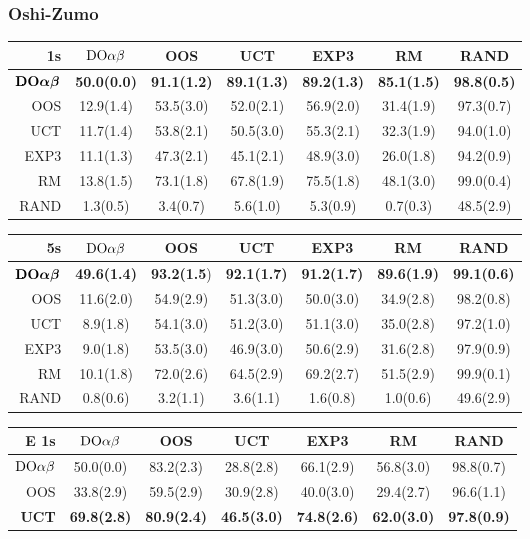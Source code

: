 \subsubsection{Oshi-Zumo}

\begin{table}[t!]
\centering
\begin{scriptsize}
\begin{tabular}{|r|cccccc|}\hline
1s&$\textrm{DO}\alpha\beta$&OOS&UCT&EXP3&RM&RAND\\\hline
$\textrm{\bf DO}\boldsymbol{\alpha\beta}$&\textbf{50.0(0.0)}&\textbf{91.1(1.2)}&\textbf{89.1(1.3)}&\textbf{89.2(1.3)}&\textbf{85.1(1.5)}&\textbf{98.8(0.5)}\\
OOS&12.9(1.4)&53.5(3.0)&52.0(2.1)&56.9(2.0)&31.4(1.9)&97.3(0.7)\\
UCT&11.7(1.4)&53.8(2.1)&50.5(3.0)&55.3(2.1)&32.3(1.9)&94.0(1.0)\\
EXP3&11.1(1.3)&47.3(2.1)&45.1(2.1)&48.9(3.0)&26.0(1.8)&94.2(0.9)\\
RM&13.8(1.5)&73.1(1.8)&67.8(1.9)&75.5(1.8)&48.1(3.0)&99.0(0.4)\\
RAND&1.3(0.5)&3.4(0.7)&5.6(1.0)&5.3(0.9)&0.7(0.3)&48.5(2.9)\\
\hline
\end{tabular}
\begin{tabular}{|r|cccccc|}\hline
5s&$\textrm{DO}\alpha\beta$&OOS&UCT&EXP3&RM&RAND\\\hline
$\textrm{\bf DO}\boldsymbol{\alpha\beta}$&\textbf{49.6(1.4)}&\textbf{93.2(1.5})&\textbf{92.1(1.7)}&\textbf{91.2(1.7)}&\textbf{89.6(1.9)}&\textbf{99.1(0.6)}\\
OOS&11.6(2.0)&54.9(2.9)&51.3(3.0)&50.0(3.0)&34.9(2.8)&98.2(0.8)\\
UCT&8.9(1.8)&54.1(3.0)&51.2(3.0)&51.1(3.0)&35.0(2.8)&97.2(1.0)\\
EXP3&9.0(1.8)&53.5(3.0)&46.9(3.0)&50.6(2.9)&31.6(2.8)&97.9(0.9)\\
RM&10.1(1.8)&72.0(2.6)&64.5(2.9)&69.2(2.7)&51.5(2.9)&99.9(0.1)\\
RAND&0.8(0.6)&3.2(1.1)&3.6(1.1)&1.6(0.8)&1.0(0.6)&49.6(2.9)\\
\hline
\end{tabular}
\begin{tabular}{|r|cccccc|}\hline
E 1s&$\textrm{DO}\alpha\beta$&OOS&UCT&EXP3&RM&RAND\\\hline
$\textrm{DO}\alpha\beta$&50.0(0.0)&83.2(2.3)&28.8(2.8)&66.1(2.9)&56.8(3.0)&98.8(0.7)\\
OOS&33.8(2.9)&59.5(2.9)&30.9(2.8)&40.0(3.0)&29.4(2.7)&96.6(1.1)\\
\textbf{UCT}&\textbf{69.8(2.8)}&\textbf{80.9(2.4)}&\textbf{46.5(3.0)}&\textbf{74.8(2.6)}&\textbf{62.0(3.0)}&\textbf{97.8(0.9)}\\

\end{tabular}
\end{scriptsize}
\end{table}
